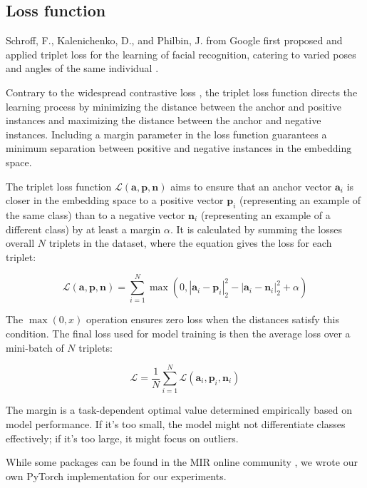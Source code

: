 \subsection{Loss function}
\label{subsec:loss-function}

Schroff, F., Kalenichenko, D., and Philbin, J. from Google first proposed and applied triplet loss for the learning of facial recognition, catering to varied poses and angles of the same individual \cite{Schroff2015FaceNet:Clustering}.

Contrary to the widespread contrastive loss \cite{supercontrast}, the triplet loss function directs the learning process by minimizing the distance between the anchor and positive instances and maximizing the distance between the anchor and negative instances. Including a margin parameter in the loss function guarantees a minimum separation between positive and negative instances in the embedding space.

The triplet loss function $\mathcal{L}(\mathbf{a}, \mathbf{p}, \mathbf{n})$ aims to ensure that an anchor vector $\mathbf{a}_i$ is closer in the embedding space to a positive vector $\mathbf{p}_i$ (representing an example of the same class) than to a negative vector $\mathbf{n}_i$ (representing an example of a different class) by at least a margin $\alpha$. It is calculated by summing the losses overall $N$ triplets in the dataset, where the equation gives the loss for each triplet:

\begin{equation}
\mathcal{L}(\mathbf{a}, \mathbf{p}, \mathbf{n}) = \sum_{i=1}^{N} \max \left(0, \left| \mathbf{a}_i - \mathbf{p}_i \right|_2^2 - \left| \mathbf{a}_i - \mathbf{n}_i \right|_2^2 + \alpha \right)
\end{equation}

The $\max(0, x)$ operation ensures zero loss when the distances satisfy this condition. The final loss used for model training is then the average loss over a mini-batch of $N$ triplets:

\begin{equation}
\mathcal{L} = \frac{1}{N} \sum_{i=1}^{N} \mathcal{L}(\mathbf{a}_i, \mathbf{p}_i, \mathbf{n}_i)
\end{equation}

The margin is a task-dependent optimal value determined empirically based on model performance. If it's too small, the model might not differentiate classes effectively; if it's too large, it might focus on outliers.

While some packages can be found in the MIR online community \cite{auraloss}, we wrote our own PyTorch \cite{Paszke2019PyTorch:Library} implementation for our experiments.

